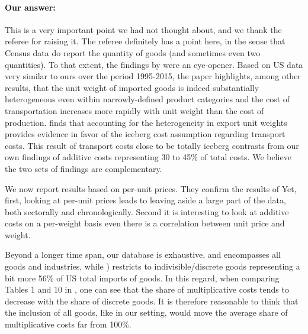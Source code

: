 \documentclass[a4paper,11pt]{article}
\begin{document}
\begin{itemize}
\begin{enumerate}
\begin{table}[htbp]
\paragraph{Our answer:}
\noindent This is a very important point we had not thought about, and we thank the referee for raising it.
The referee definitely has a point here, in the sense that Census data do report the quantity of goods (and sometimes even two quantities).
To that extent, the findings by \cite{Lashkaripour_JIE2020} were an eye-opener.
Based on US data very similar to ours over the period 1995-2015, the paper highlights, among other results, that the unit weight of imported goods is indeed substantially heterogeneous even within narrowly-defined product categories and the cost of transportation increases more rapidly with unit weight than the cost of production.  \cite{Lashkaripour_JIE2020} finds that accounting for the heterogeneity in export unit weights provides evidence in favor of the iceberg cost assumption regarding transport costs.
This result of transport costs close to be totally iceberg contrasts from our own findings of additive costs representing 30 to 45\% of total costs.
We believe the two sets of findings are complementary.

We now report results based on per-unit prices.
They confirm the results of \cite{Lashkaripour_JIE2020}
Yet, first, looking at per-unit prices leads to leaving aside a large part of the data, both sectorally and chronologically.
Second  it is interesting to look at additive costs on a per-weight basis even there is a correlation between unit price and weight.

Beyond a longer time span, our database is exhaustive, and encompasses all goods and industries, while \citet{Lashkaripour_JIE2020}) restricts to indivisible/discrete goods representing a bit more 56\% of US total imports of goods. In this regard, when comparing Tables 1 and 10 in \citet{Lashkaripour_JIE2020}, one can see that the share of multiplicative costs tends to decrease with the share of discrete goods. It is therefore reasonable to think that the inclusion of all goods, like in our setting, would move the average share of multiplicative costs far from 100\%.


\end{table}
\end{enumerate}
\end{itemize}
\end{document}
